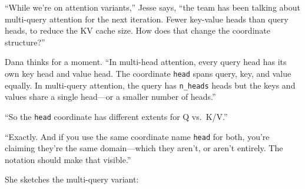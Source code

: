 \documentclass[11pt,]{article}
\begin{document}
``While we're on attention variants,'' Jesse says, ``the team has been
talking about multi-query attention for the next iteration. Fewer
key-value heads than query heads, to reduce the KV cache size. How does
that change the coordinate structure?''

Dana thinks for a moment. ``In multi-head attention, every query head
has its own key head and value head. The coordinate \texttt{head} spans
query, key, and value equally. In multi-query attention, the query has
\texttt{n\_heads} heads but the keys and values share a single head---or
a smaller number of heads.''

``So the \texttt{head} coordinate has different extents for Q vs.~K/V.''

``Exactly. And if you use the same coordinate name \texttt{head} for
both, you're claiming they're the same domain---which they aren't, or
aren't entirely. The notation should make that visible.''

She sketches the multi-query variant:
\end{document}
